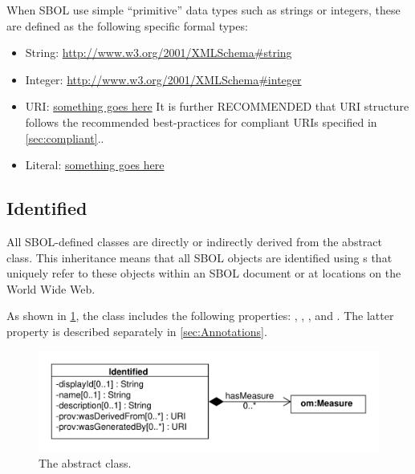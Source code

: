 When SBOL use simple ``primitive'' data types such as strings or integers, these are defined as the following specific formal types:
\begin{itemize}
\item String: \url{http://www.w3.org/2001/XMLSchema#string}
\item Integer: \url{http://www.w3.org/2001/XMLSchema#integer}
\item URI: \url{something goes here}
  It is further RECOMMENDED that URI structure follows the recommended best-practices for compliant URIs specified in \ref{sec:compliant}..
\item Literal: \url{something goes here}
\end{itemize}

\subsection{Identified}
\label{sec:Identified}



All SBOL-defined classes are directly or indirectly derived from the   abstract class. This inheritance means that all SBOL objects are identified using s that uniquely refer to these objects within an SBOL document or at locations on the World Wide Web. 

As shown in \ref{uml:identified}, the  class includes the following properties: , ,  , and . The latter property is described separately in \ref{sec:Annotations}.

\begin{figure}[ht]
\begin{center}
\includegraphics[scale=0.6]{uml/identified}
\caption[]{The  abstract class.}
\label{uml:identified}
\end{center}
\end{figure}

